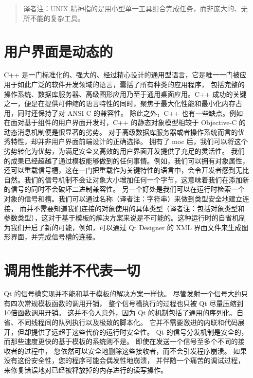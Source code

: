 \begin{quote}
译者注：UNIX 精神指的是用小型单一工具组合完成任务，而非庞大的、无所不能的复杂工具。
\end{quote}


\section{用户界面是动态的}

C++ 是一门标准化的、强大的、经过精心设计的通用型语言，它是唯一一门被应用于如此广泛的软件开发领域的语言，囊括了所有种类的应用程序，
包括完整的操作系统、数据库服务器、高级图形应用乃至于通用桌面应用。C++ 成功的关键之一，便是在提供可伸缩的语言特性的同时，聚焦于最大化性能和最小化内存占用，同时还保持了对 ANSI C 的兼容性。
除此之外，C++ 也有一些缺点。例如在面对基于组件的用户界面开发时，C++ 的静态对象模型相较于 Objective-C 的动态消息机制便是很显著的劣势。
对于高级数据库服务器或者操作系统而言的优秀特性，却并非用户界面前端设计的正确选择。
拥有了 moc 后，我们可以将这个劣势转化为优势，为满足安全又高效的用户界面开发提供了充足的灵活性。
我们的成果已经超越了通过模板能够做到的任何事情。例如，我们可以拥有对象属性，
还可以重载信号槽，这在一门把重载作为关键特性的语言中，会令开发者感到无比自然。我们的信号机制不会让对象大小增加任何一个字节，这意味着我们在添加新的信号的同时不会破坏二进制兼容性。
另一个好处是我们可以在运行时检索一个对象的信号和槽。我们可以通过名称（译者注：字符串）来做到类型安全地建立连接，
而并不需要知道我们连接的对象使用的具体类型（译者注：包括对象类型和参数类型），这对于基于模板的解决方案来说是不可能的。这种运行时的自省机制为我们开启了新的可能，例如，可以通过 Qt Designer 的 XML 界面文件来生成图形界面，并完成信号槽的连接。

\section{调用性能并不代表一切}

Qt 的信号槽实现并不能和基于模板的解决方案一样快。
尽管发射一个信号大约只有四次常规模板函数的调用开销，
整个信号槽执行的过程也只被 Qt 尽量压缩到10倍函数调用开销。
这并不令人意外，因为 Qt 的机制包括了通用的序列化、自省、不同线程间的队列执行以及极致的脚本化。
它并不需要激进的内联和代码展开，但却提供了远超于这些代价的运行时安全性。
Qt 的信号分发机制是安全的，而那些速度更快的基于模板的系统则不是。
即使在发送一个信号至多个不同的接收者的过程中，
您依然可以安全地删除这些接收者，而不会引发程序崩溃。
如果没有这份安全性，您的程序可能会偶发性地崩溃，
并伴随一个痛苦的调试过程，来修复错误地对已经被释放掉的内存进行的读写操作。



